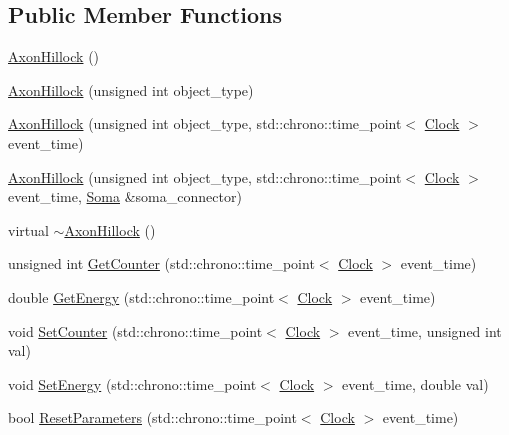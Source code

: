 \subsection*{Public Member Functions}
\begin{DoxyCompactItemize}
\item 
\hyperlink{class_axon_hillock_a432095dfb25ece393cdd83b5eb4f097a}{Axon\+Hillock} ()
\item 
\hyperlink{class_axon_hillock_a20a4da0885f32bfca34ab5cda2a13562}{Axon\+Hillock} (unsigned int object\+\_\+type)
\item 
\hyperlink{class_axon_hillock_acc61c61c8dfddd603e868a2fcbfd5e9c}{Axon\+Hillock} (unsigned int object\+\_\+type, std\+::chrono\+::time\+\_\+point$<$ \hyperlink{universe_8h_a0ef8d951d1ca5ab3cfaf7ab4c7a6fd80}{Clock} $>$ event\+\_\+time)
\item 
\hyperlink{class_axon_hillock_a250945e24a51475369b6c7881c0d955b}{Axon\+Hillock} (unsigned int object\+\_\+type, std\+::chrono\+::time\+\_\+point$<$ \hyperlink{universe_8h_a0ef8d951d1ca5ab3cfaf7ab4c7a6fd80}{Clock} $>$ event\+\_\+time, \hyperlink{class_soma}{Soma} \&soma\+\_\+connector)
\item 
virtual \hyperlink{class_axon_hillock_ae86220026d7c87edc1c514521d66f992}{$\sim$\+Axon\+Hillock} ()
\item 
unsigned int \hyperlink{class_axon_hillock_a429c9876d679fe8de4533725afc4875c}{Get\+Counter} (std\+::chrono\+::time\+\_\+point$<$ \hyperlink{universe_8h_a0ef8d951d1ca5ab3cfaf7ab4c7a6fd80}{Clock} $>$ event\+\_\+time)
\item 
double \hyperlink{class_axon_hillock_ab5ac3ab8771b96acf7e3fa07152525a5}{Get\+Energy} (std\+::chrono\+::time\+\_\+point$<$ \hyperlink{universe_8h_a0ef8d951d1ca5ab3cfaf7ab4c7a6fd80}{Clock} $>$ event\+\_\+time)
\item 
void \hyperlink{class_axon_hillock_a0220cee0ad99ddc48496982078c1856c}{Set\+Counter} (std\+::chrono\+::time\+\_\+point$<$ \hyperlink{universe_8h_a0ef8d951d1ca5ab3cfaf7ab4c7a6fd80}{Clock} $>$ event\+\_\+time, unsigned int val)
\item 
void \hyperlink{class_axon_hillock_a830afd18810e0eaa11a9e7a500b8f0c4}{Set\+Energy} (std\+::chrono\+::time\+\_\+point$<$ \hyperlink{universe_8h_a0ef8d951d1ca5ab3cfaf7ab4c7a6fd80}{Clock} $>$ event\+\_\+time, double val)
\item 
bool \hyperlink{class_axon_hillock_acec1571ef0b74f7f5ce6699c9b459b4f}{Reset\+Parameters} (std\+::chrono\+::time\+\_\+point$<$ \hyperlink{universe_8h_a0ef8d951d1ca5ab3cfaf7ab4c7a6fd80}{Clock} $>$ event\+\_\+time)

\end{DoxyCompactItemize}

